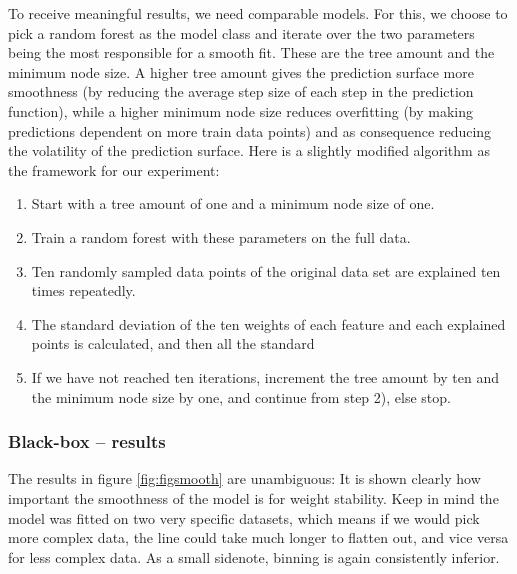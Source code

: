 \documentclass[
]{krantz}
\begin{document}
To receive meaningful results, we need comparable models.
For this, we choose to pick a random forest as the model class and iterate over the two parameters being the most responsible for a smooth fit.
These are the tree amount and the minimum node size.
A higher tree amount gives the prediction surface more smoothness (by reducing the average step size of each step in the prediction function), while a higher minimum node size reduces overfitting (by making predictions dependent on more train data points) and as consequence reducing the volatility of the prediction surface.
Here is a slightly modified algorithm as the framework for our experiment:

\begin{enumerate}
\def\labelenumi{\arabic{enumi})}
\item
  Start with a tree amount of one and a minimum node size of one.
\item
  Train a random forest with these parameters on the full data.
\item
  Ten randomly sampled data points of the original data set are explained ten times repeatedly.
\item
  The standard deviation of the ten weights of each feature and each explained points is calculated, and then all the standard
\item
  If we have not reached ten iterations, increment the tree amount by ten and the minimum node size by one, and continue from step 2), else stop.
\end{enumerate}

\hypertarget{black-box-results}{%
\subsubsection{Black-box -- results}\label{black-box-results}}

The results in figure \ref{fig:figsmooth} are unambiguous: It is shown clearly how important the smoothness of the model is for weight stability.
Keep in mind the model was fitted on two very specific datasets, which means if we would pick more complex data, the line could take much longer to flatten out, and vice versa for less complex data.
As a small sidenote, binning is again consistently inferior.
\end{document}
